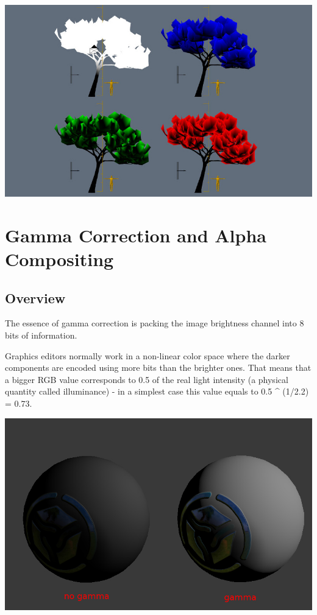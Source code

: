 \documentclass[a4paper,12pt,oneside]{sphinxmanual}
\begin{document}
{\hfill\includegraphics[width=1.000\linewidth]{wind_bending_vcolors.jpg}\hfill}


\chapter{Gamma Correction and Alpha Compositing}
\label{gamma_alpha::doc}\label{gamma_alpha:gamma}\label{gamma_alpha:id1}

\section{Overview}
\label{gamma_alpha:id2}
The essence of gamma correction is packing the image brightness channel into 8 bits of information.

Graphics editors normally work in a non-linear color space where the darker components are encoded using more bits than the brighter ones. That means that a bigger RGB value corresponds to 0.5 of the real light intensity (a physical quantity called illuminance) - in a simplest case this value equals to 0.5 \textasciicircum{} (1/2.2) = 0.73.

{\hfill\includegraphics[width=1.000\linewidth]{gamma.jpg}\hfill}
\end{document}
